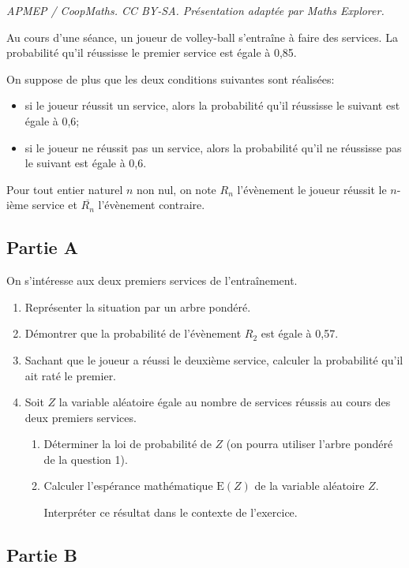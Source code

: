 \documentclass[10pt]{article}
\begin{document}
\noindent\textit{APMEP / CoopMaths. CC BY-SA. Présentation adaptée par Maths Explorer.}\par\medskip
Au cours d'une séance, un joueur de volley-ball s'entraîne à faire des services. La probabilité qu'il réussisse le premier service est égale à 0,85.

On suppose de plus que les deux conditions suivantes sont réalisées:

\begin{itemize}[label=$\bullet$]
\item si le joueur réussit un service, alors la probabilité qu'il réussisse le suivant est égale à 0,6;
\item si le joueur ne réussit pas un service, alors la probabilité qu'il ne réussisse pas le suivant est égale à 0,6.
\end{itemize}

Pour tout entier naturel $n$ non nul, on note $R_{n}$ l'évènement \og le joueur réussit le $n$-ième service \fg{} et $\overline{R_{n}}$ l'évènement contraire.

\subsection*{Partie A}
On s'intéresse aux deux premiers services de l'entraînement.

\begin{enumerate}
	\item Représenter la situation par un arbre pondéré.
	\item Démontrer que la probabilité de l'évènement $R_{2}$ est égale à 0,57.
	\item Sachant que le joueur a réussi le deuxième service, calculer la probabilité qu'il ait raté le premier.
	\item Soit $Z$ la variable aléatoire égale au nombre de services réussis au cours des deux premiers services.
	\begin{enumerate}
		\item Déterminer la loi de probabilité de $Z$ (on pourra utiliser l'arbre pondéré de la question 1).
		\item Calculer l'espérance mathématique $\mathrm{E}(Z)$ de la variable aléatoire $Z$.

		Interpréter ce résultat dans le contexte de l'exercice.
	\end{enumerate}
\end{enumerate}

\subsection*{Partie B}
\end{document}
